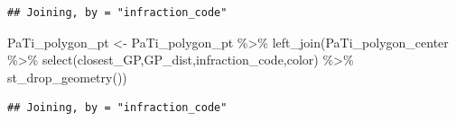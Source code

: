 \documentclass[
]{article}
\newenvironment{Shaded}{\begin{snugshade}}{\end{snugshade}}
\newcommand{\FunctionTok}[1]{\textcolor[rgb]{0.00,0.00,0.00}{#1}}
\newcommand{\NormalTok}[1]{#1}
\newcommand{\OtherTok}[1]{\textcolor[rgb]{0.56,0.35,0.01}{#1}}
\newcommand{\SpecialCharTok}[1]{\textcolor[rgb]{0.00,0.00,0.00}{#1}}
\begin{document}
\begin{verbatim}
## Joining, by = "infraction_code"
\end{verbatim}

\begin{Shaded}
\begin{Highlighting}[]
\NormalTok{PaTi\_polygon\_pt }\OtherTok{\textless{}{-}}\NormalTok{ PaTi\_polygon\_pt }\SpecialCharTok{\%\textgreater{}\%} \FunctionTok{left\_join}\NormalTok{(PaTi\_polygon\_center }\SpecialCharTok{\%\textgreater{}\%} \FunctionTok{select}\NormalTok{(closest\_GP,GP\_dist,infraction\_code,color) }\SpecialCharTok{\%\textgreater{}\%} \FunctionTok{st\_drop\_geometry}\NormalTok{())}
\end{Highlighting}
\end{Shaded}

\begin{verbatim}
## Joining, by = "infraction_code"
\end{verbatim}
\end{document}
